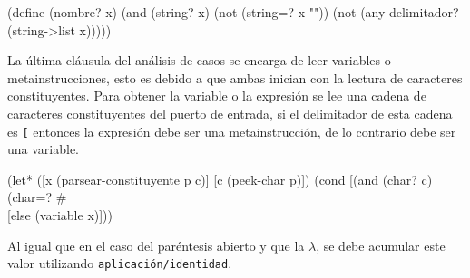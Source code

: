 \documentclass[letterpaper,twoside,openright,11pt]{book}
\begin{document}
\nwenddocs{}\plusendmoddef
(define (nombre? x)
  (and (string? x)
       (not (string=? x ""))
       (not (any delimitador? (string->list x)))))

\eatline
{}\nwendcode{}\nwdocspar

La última cláusula del análisis de casos se encarga de leer variables o metainstrucciones, esto es debido a que ambas inician con la lectura de caracteres constituyentes. Para obtener la variable o la expresión se lee una cadena de caracteres constituyentes del puerto de entrada, si el delimitador de esta cadena es {\tt{}{}{}[} entonces la expresión debe ser una metainstrucción, de lo contrario debe ser una variable.

\nwenddocs{}\endmoddef
(let* ([x (parsear-constituyente p c)]
       [c (peek-char p)])
  (cond [(and (char? c) (char=? #\\[ c))
         (read-char p)
         (metainstrucción x (parsear-corchetes p))]
        [else
         (variable x)]))
\nwendcode{}\nwdocspar

Al igual que en el caso del paréntesis abierto y que la \( λ \), se debe acumular este valor utilizando {\tt{}\protect{}aplicación\protect{}/identidad}.
\end{document}
